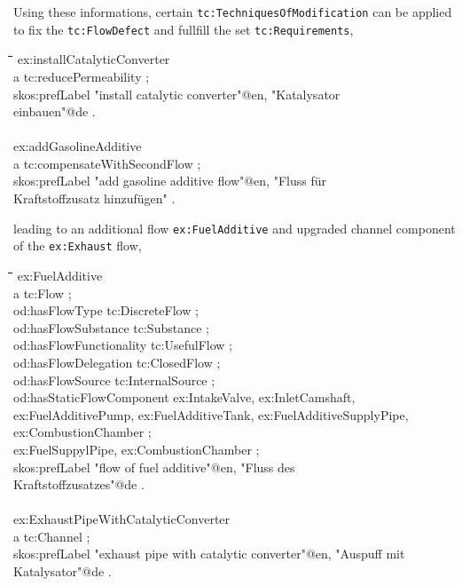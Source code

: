 \documentclass[a4paper,11pt]{article}
\newenvironment{code}{\tt \begin{tabbing}
\hskip12pt\=\hskip12pt\=\hskip12pt\=\hskip12pt\=\hskip5cm\=\hskip5cm\=\kill}
{\end{tabbing}}
\begin{document}
\begin{itemize}
    Using these informations, certain \texttt{tc:TechniquesOfModification} can 
    be applied to fix the \texttt{tc:FlowDefect} and fullfill the set 
    \texttt{tc:Requirements},
    
    \begin{code}
    ex:installCatalyticConverter \\
    \> a tc:reducePermeability ; \\
    \> skos:prefLabel "install catalytic converter"@en, "Katalysator  \\
    \> einbauen"@de .  \\
    \\
    ex:addGasolineAdditive \\
    \> a tc:compensateWithSecondFlow ; \\
    \> skos:prefLabel "add gasoline additive flow"@en, "Fluss für  \\
    \> Kraftstoffzusatz hinzufügen" . \\
    \end{code}
    
    leading to an additional flow \texttt{ex:FuelAdditive} and upgraded channel
    component of the \texttt{ex:Exhaust} flow,
    \begin{code}
    ex:FuelAdditive \\
    \> a tc:Flow ; \\
    \> od:hasFlowType tc:DiscreteFlow ; \\
    \> od:hasFlowSubstance tc:Substance ; \\
    \> od:hasFlowFunctionality tc:UsefulFlow ; \\
    \> od:hasFlowDelegation tc:ClosedFlow ; \\
    \> od:hasFlowSource tc:InternalSource ; \\
    \> od:hasStaticFlowComponent ex:IntakeValve, ex:InletCamshaft, \\
    \> ex:FuelAdditivePump, ex:FuelAdditiveTank, ex:FuelAdditiveSupplyPipe, \\
    \> ex:CombustionChamber ; \\
    \> ex:FuelSuppylPipe, ex:CombustionChamber ; \\
    \> skos:prefLabel "flow of fuel additive"@en, "Fluss des  \\
    \> Kraftstoffzusatzes"@de . \\
    \\
    ex:ExhaustPipeWithCatalyticConverter \\
    \> a tc:Channel ; \\
    \> skos:prefLabel "exhaust pipe with catalytic converter"@en, "Auspuff mit  \\
    \> Katalysator"@de . \\
    \end{code}
    

\end{itemize}
\end{document}
